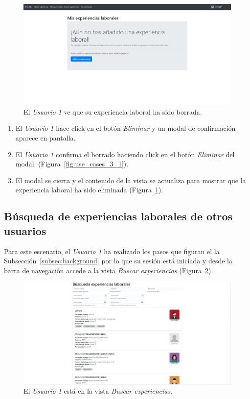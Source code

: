 \documentclass[a4paper, 12pt]{book}
\begin{document}
    \begin{figure}
        \centering
        \includegraphics[width=15cm, keepaspectratio]{img/1.1.png}
        \caption{El \emph{Usuario 1} ve que su experiencia laboral ha sido borrada.}
        \label{fig:use_cases_3_2}
    \end{figure}

    \begin{enumerate}
        \item El \emph{Usuario 1} hace click en el botón \emph{Eliminar} y un modal de confirmación aparece en pantalla.
        \item El \emph{Usuario 1} confirma el borrado haciendo click en el botón \emph{Eliminar} del modal.
        (Figura~\ref{fig:use_cases_3_1}).
        \item El modal se cierra y el contenido de la vista se actualiza para mostrar que la experiencia laboral ha sido eliminada (Figura~\ref{fig:use_cases_3_2}).
    \end{enumerate}

    \subsection{Búsqueda de experiencias laborales de otros usuarios}
    \label{subsec:search_work_experiences}
    Para este escenario, el \emph{Usuario 1} ha realizado los pasos que figuran el la Subsección~\ref{subsec:background}
    por lo que su sesión está iniciada y desde la barra de navegación accede a la vista \emph{Buscar experiencias}
    (Figura~\ref{fig:use_cases_4_1}).

    \begin{figure}
        \centering
        \includegraphics[width=15cm, keepaspectratio]{img/4.1.png}
        \caption{El \emph{Usuario 1} está en la vista \emph{Buscar experiencias}.}
        \label{fig:use_cases_4_1}
    \end{figure}
\end{document}
